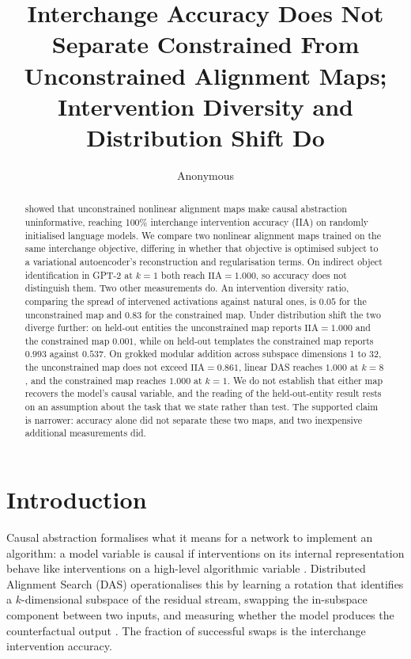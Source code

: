 \documentclass[11pt]{article}
\title{Interchange Accuracy Does Not Separate Constrained From Unconstrained
Alignment Maps; Intervention Diversity and Distribution Shift Do}
\author{Anonymous}
\date{}
\newcommand{\IIA}{\mathrm{IIA}}
\begin{document}
\linenumbers
\maketitle

\begin{abstract}
\citet{sutter2025nonlinear} showed that unconstrained nonlinear alignment maps
make causal abstraction uninformative, reaching 100\% interchange intervention
accuracy (IIA) on randomly initialised language models. We compare two nonlinear
alignment maps trained on the same interchange objective, differing in whether
that objective is optimised subject to a variational autoencoder's reconstruction
and regularisation terms. On indirect object identification in GPT-2 at $k = 1$
both reach $\IIA = 1.000$, so accuracy does not distinguish them. Two other
measurements do. An intervention diversity ratio, comparing the spread of
intervened activations against natural ones, is $0.05$ for the unconstrained map
and $0.83$ for the constrained map. Under distribution shift the two diverge
further: on held-out entities the unconstrained map reports $\IIA = 1.000$ and
the constrained map $0.001$, while on held-out templates the constrained map
reports $0.993$ against $0.537$. On grokked modular addition across subspace
dimensions 1 to 32, the unconstrained map does not exceed $\IIA = 0.861$, linear
DAS reaches $1.000$ at $k = 8$, and the constrained map reaches $1.000$ at
$k = 1$. We do not establish that either map recovers the model's causal
variable, and the reading of the held-out-entity result rests on an assumption
about the task that we state rather than test. The supported claim is narrower:
accuracy alone did not separate these two maps, and two inexpensive additional
measurements did.
\end{abstract}

\section{Introduction}
\label{sec:intro}

Causal abstraction formalises what it means for a network to implement an
algorithm: a model variable is causal if interventions on its internal
representation behave like interventions on a high-level algorithmic variable
\citep{geiger2021causal}. Distributed Alignment Search (DAS) operationalises this
by learning a rotation that identifies a $k$-dimensional subspace of the residual
stream, swapping the in-subspace component between two inputs, and measuring
whether the model produces the counterfactual output \citep{geiger2023finding}.
The fraction of successful swaps is the interchange intervention accuracy.
\end{document}
